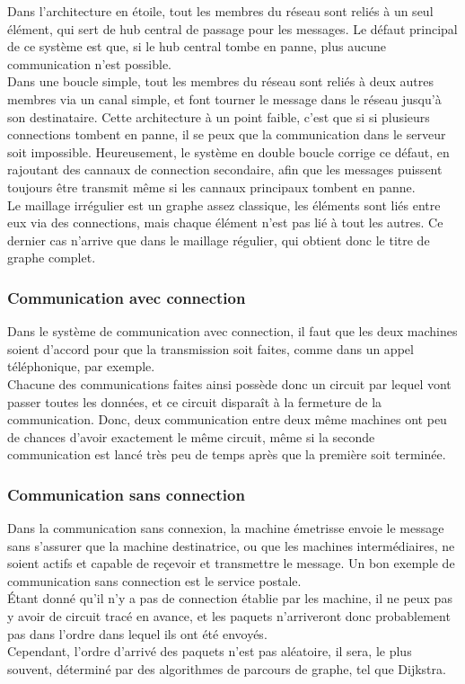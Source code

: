Dans l'architecture en étoile, tout les membres du réseau sont reliés à un seul élément, qui sert de hub central de 
passage pour les messages. Le défaut principal de ce système est que, si le hub central tombe en panne,
plus aucune communication n'est possible.\\
Dans une boucle simple, tout les membres du réseau sont reliés à deux autres membres via un canal simple, et
font tourner le message dans le réseau jusqu'à son destinataire. Cette architecture à un point faible, c'est que si
si plusieurs connections tombent en panne, il se peux que la communication dans le serveur soit impossible.
Heureusement, le système en double boucle corrige ce défaut, en rajoutant des cannaux de connection secondaire,
afin que les messages puissent toujours être transmit même si les cannaux principaux tombent en panne.\\
Le maillage irrégulier est un graphe assez classique, les éléments sont liés entre eux via des connections, mais
chaque élément n'est pas lié à tout les autres. Ce dernier cas n'arrive que dans le maillage régulier,
qui obtient donc le titre de graphe complet.

\subsubsection{Communication avec connection}
Dans le système de communication avec connection, il faut que les deux machines soient d'accord pour que la
transmission soit faites, comme dans un appel téléphonique, par exemple.\\
Chacune des communications faites ainsi possède donc un circuit par lequel vont passer toutes les données, et ce
circuit disparaît à la fermeture de la communication. Donc, deux communication entre deux même machines ont peu de
chances d'avoir exactement le même circuit, même si la seconde communication est lancé très peu de temps après
que la première soit terminée.

\subsubsection{Communication sans connection}
Dans la communication sans connexion, la machine émetrisse envoie le message sans s'assurer que la machine
destinatrice, ou que les machines intermédiaires, ne soient actifs et capable de reçevoir et transmettre le message.
Un bon exemple de communication sans connection est le service postale.\\
Étant donné qu'il n'y a pas de connection établie par les machine, il ne peux pas y avoir de circuit tracé en
avance, et les paquets n'arriveront donc probablement pas dans l'ordre dans lequel ils ont été envoyés.\\
Cependant, l'ordre d'arrivé des paquets n'est pas aléatoire, il sera, le plus souvent, déterminé par des
algorithmes de parcours de graphe, tel que Dijkstra.

